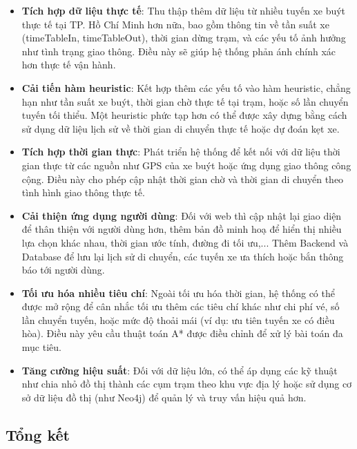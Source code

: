 \documentclass[a4paper,12pt]{article}
\begin{document}
\begin{itemize}
    \item \textbf{Tích hợp dữ liệu thực tế}: Thu thập thêm dữ liệu từ nhiều tuyến xe buýt thực tế tại TP. Hồ Chí Minh hơn nữa, bao gồm thông tin về tần suất xe (timeTableIn, timeTableOut), thời gian dừng trạm, và các yếu tố ảnh hưởng như tình trạng giao thông. Điều này sẽ giúp hệ thống phản ánh chính xác hơn thực tế vận hành.
    
    \item \textbf{Cải tiến hàm heuristic}: Kết hợp thêm các yếu tố vào hàm heuristic, chẳng hạn như tần suất xe buýt, thời gian chờ thực tế tại trạm, hoặc số lần chuyển tuyến tối thiểu. Một heuristic phức tạp hơn có thể được xây dựng bằng cách sử dụng dữ liệu lịch sử về thời gian di chuyển thực tế hoặc dự đoán kẹt xe.
    
    \item \textbf{Tích hợp thời gian thực}: Phát triển hệ thống để kết nối với dữ liệu thời gian thực từ các nguồn như GPS của xe buýt hoặc ứng dụng giao thông công cộng. Điều này cho phép cập nhật thời gian chờ và thời gian di chuyển theo tình hình giao thông thực tế.
    
    \item \textbf{Cải thiện ứng dụng người dùng}: Đối với web thì cập nhật lại giao diện để thân thiện với người dùng hơn, thêm bản đồ minh hoạ để hiển thị nhiều lựa chọn khác nhau, thời gian ước tính, đường đi tối ưu,... Thêm Backend và Database để lưu lại lịch sử di chuyển, các tuyến xe ưa thích hoặc bắn thông báo tới người dùng.
    
    \item \textbf{Tối ưu hóa nhiều tiêu chí}: Ngoài tối ưu hóa thời gian, hệ thống có thể được mở rộng để cân nhắc tối ưu thêm các tiêu chí khác như chi phí vé, số lần chuyển tuyến, hoặc mức độ thoải mái (ví dụ: ưu tiên tuyến xe có điều hòa). Điều này yêu cầu thuật toán A* được điều chỉnh để xử lý bài toán đa mục tiêu.
    
    \item \textbf{Tăng cường hiệu suất}: Đối với dữ liệu lớn, có thể áp dụng các kỹ thuật như chia nhỏ đồ thị thành các cụm trạm theo khu vực địa lý hoặc sử dụng cơ sở dữ liệu đồ thị (như Neo4j) để quản lý và truy vấn hiệu quả hơn.
\end{itemize}

\newpage
\begin{center}
\section*{Tổng kết}
\end{center}
\end{document}
